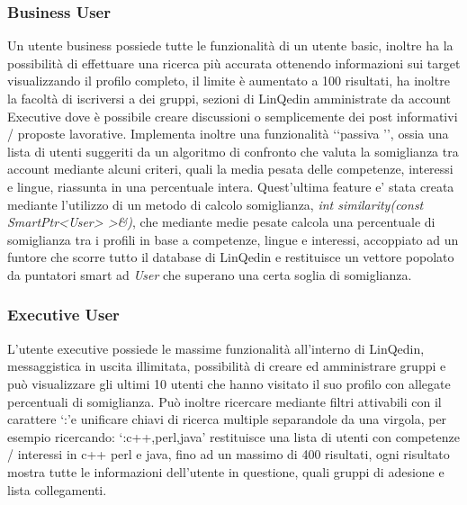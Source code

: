 \subsubsection*{Business User}
Un utente business possiede tutte le funzionalità di un utente basic, inoltre ha la possibilità di effettuare una ricerca più accurata ottenendo informazioni sui target visualizzando il profilo completo,
il limite è aumentato a 100 risultati, ha inoltre la facoltà di iscriversi a dei gruppi, sezioni di LinQedin amministrate da account Executive dove è possibile creare discussioni o
semplicemente dei post informativi / proposte lavorative. Implementa inoltre una funzionalità \lq\lq passiva \rq\rq, ossia una lista di utenti suggeriti da un algoritmo di
confronto che valuta la somiglianza tra account mediante alcuni criteri, quali la media pesata delle competenze, interessi e lingue, riassunta in una percentuale intera. Quest'ultima feature e' stata creata mediante l'utilizzo di un metodo di calcolo somiglianza, \textit{int similarity(const SmartPtr<User> >\&)}, che mediante medie pesate calcola una percentuale di somiglianza tra i profili in base a competenze, lingue e interessi, accoppiato ad un funtore che scorre tutto il database di LinQedin e restituisce un vettore popolato da puntatori smart ad \textit{User} che superano una certa soglia di somiglianza.
\subsubsection*{Executive User}
L'utente executive possiede le massime funzionalità all'interno di LinQedin, messaggistica in uscita illimitata, possibilità di creare ed amministrare gruppi e può visualizzare
gli ultimi 10 utenti che hanno visitato il suo profilo con allegate percentuali di somiglianza.
Può inoltre ricercare mediante filtri attivabili con il carattere \lq:\rq e unificare chiavi di ricerca multiple separandole da una virgola, per esempio ricercando: \lq:c++,perl,java\rq
restituisce una lista di utenti con competenze / interessi in c++ perl e java, fino ad un massimo di 400 risultati, ogni risultato mostra tutte le informazioni dell'utente in questione,
quali gruppi di adesione e lista collegamenti.
